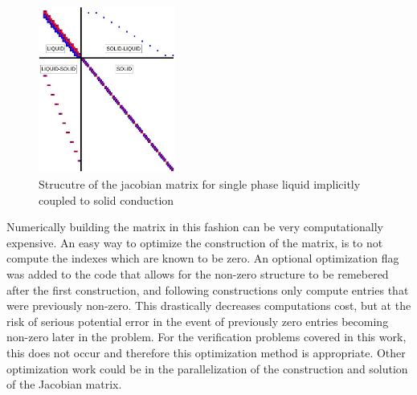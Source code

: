     \begin{figure}[!h]
    	\centering
    	\includegraphics[width=0.40\textwidth]{images/Implicit-Diagram.jpg}
    	\caption{Strucutre of the jacobian matrix for single phase liquid
    	implicitly coupled to solid conduction}
    	\label{fig:Implicit-Diagram}
    \end{figure}
    
    Numerically building the matrix in this fashion can be very computationally
    expensive. An easy way to optimize the construction of the matrix, is to not
    compute the indexes which are known to be zero. An optional optimization
    flag was added to the code that allows for the non-zero structure to be
    remebered after the first construction, and following constructions only
    compute entries that were previously non-zero. This drastically decreases
    computations cost, but at the risk of serious potential error in the event
    of previously zero entries becoming non-zero later in the problem. For the
    verification problems covered in this work, this does not occur and
    therefore this optimization method is appropriate. Other optimization work
    could be in the parallelization of the construction and solution of the
    Jacobian matrix. 
   
    
    
    
    






